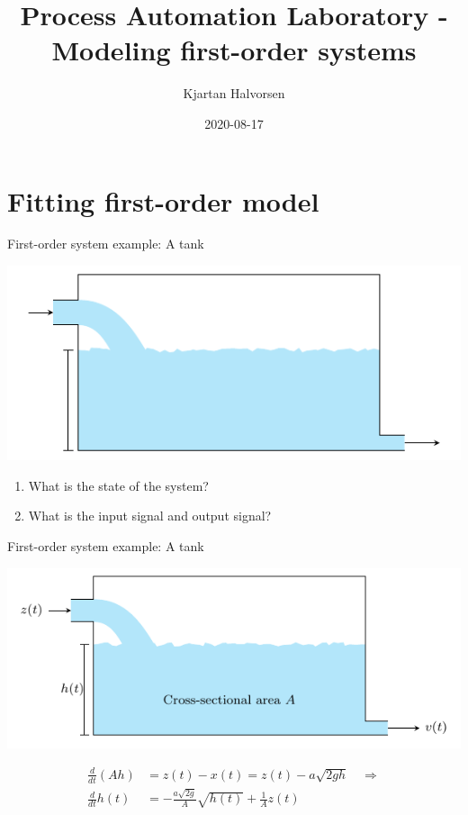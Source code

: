 \documentclass[presentation,aspectratio=169]{beamer}
\author{Kjartan Halvorsen}
\date{2020-08-17}
\title{Process Automation Laboratory - Modeling first-order systems}
\begin{document}
\maketitle

\section{Fitting first-order model}
\label{sec:org69b8c5a}
\begin{frame}[label={sec:orge41dbc3}]{First-order system example: A tank}
\begin{center}
\includegraphics[width=0.7\linewidth]{../../figures/tank-with-hole-no-variables}
\end{center}

\begin{enumerate}
\item What is the \alert{state} of the system?
\item What is the \alert{input signal} and \alert{output signal}?
\end{enumerate}
\end{frame}



\begin{frame}[label={sec:org7ad9778}]{First-order system example: A tank}
\begin{center}
\includegraphics[width=0.7\linewidth]{../../figures/tank-with-hole-simple}
\end{center}

\begin{align*}
\frac{d}{dt} (Ah) &=  z(t) - x(t) = z(t) - a \sqrt{2gh}\quad \Rightarrow\\
\frac{d}{dt} h(t) &= - \frac{a\sqrt{2g}}{A} \sqrt{h(t)} + \frac{1}{A} z(t)
\end{align*}
\end{frame}
\end{document}
